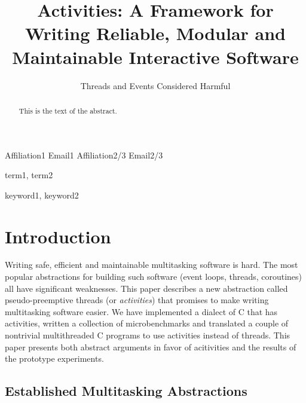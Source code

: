 \documentclass[11pt,preprint]{sigplanconf}
\begin{document}
\setlength{\pdfpageheight}{\paperheight}
\setlength{\pdfpagewidth}{\paperwidth}



\title{Activities: A Framework for Writing Reliable, Modular and Maintainable Interactive Software}
\subtitle{Threads and Events Considered Harmful}

           {Affiliation1}
           {Email1}
           {Affiliation2/3}
           {Email2/3}

\maketitle

\begin{abstract}
This is the text of the abstract.
\end{abstract}


\terms
term1, term2

\keywords
keyword1, keyword2

\section{Introduction}

Writing safe, efficient and maintainable multitasking software is hard.
The most popular abstractions for building such software (event loops, threads, coroutines) all have significant weaknesses.
This paper describes a new abstraction called pseudo-preemptive threads (or \emph{activities}) that promises to make writing multitasking software easier.
We have implemented a dialect of C that has activities, written a collection of microbenchmarks and translated a couple of nontrivial multithreaded C programs to use activities instead of threads.
This paper presents both abstract arguments in favor of acitivities and the results of the prototype experiments.

\subsection{Established Multitasking Abstractions}
\end{document}
